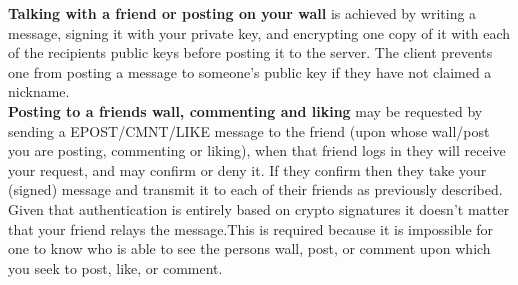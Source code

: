 \textbf{Talking with a friend or posting on your wall} is achieved by writing
a message, signing it with your private key, and encrypting one copy of it with
each of the recipients public keys before posting it to the server. The client
prevents one from posting a message to someone's public key if they have not
claimed a nickname.\\

\textbf{Posting to a friends wall, commenting and liking} may be requested by
sending a EPOST/CMNT/LIKE message to the friend (upon whose wall/post you are
posting, commenting or liking), when that friend logs in they will receive your
request, and may confirm or deny it. If they confirm then they take your (signed)
message and transmit it to each of their friends as previously described. Given
that authentication is entirely based on crypto signatures it doesn't matter
that your friend relays the message.This is required because it is impossible
for one to know who is able to see the persons wall, post, or comment upon which
you seek to post, like, or comment.
